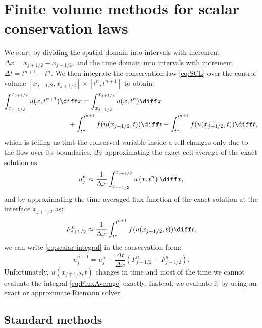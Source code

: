 \section{Finite volume methods for scalar conservation laws}
\label{sec:FVM-scalar}

We start by dividing the spatial domain into intervals with increment $ \Delta x = x_{j+1/2} - x_{j-1/2} $, and the time domain into intervals with increment $ \Delta t = t^{n+1} - t^n $. We then integrate the conservation law \eqref{eq:SCL} over the control volume $ \left[ x_{j-1/2}, x_{j+1/2} \right] \times \left[ t^n, t^{n+1} \right] $ to obtain:
\begin{align} \label{eq:scalar-integral}
\int_{x_{j-1/2}}^{x_{j+1/2}} u(x,t^{n+1}) \diff x & = \int_{x_{j-1/2}}^{x_{j+1/2}} u(x,t^n) \diff x \notag \\
 & \hspace{-7mm} + \int_{t^n}^{t^{n+1}} f(u(x_{j-1/2},t)) \diff t - \int_{t^n}^{t^{n+1}} f(u(x_{j+1/2},t)) \diff t,
\end{align}
which is telling us that the conserved variable inside a cell changes only due to the flow over its boundaries. By approximating the exact cell average of the exact solution as:
\begin{equation} \label{eq:CellAverage}
u_j^n \approx \frac{1}{\Delta x} \int_{x_{j-1/2}}^{x_{j+1/2}} u \left( x,t^n \right) \diff x,
\end{equation} 
and by approximating the time averaged flux function of the exact solution at the interface $ x_{j+1/2} $ as:
\begin{equation} \label{eq:FluxAverage}
F_{j+1/2}^n \approx \frac{1}{\Delta x} \int_{t^n}^{t^{n+1}} f(u(x_{j+1/2},t)) \diff t,
\end{equation}
we can write \eqref{eq:scalar-integral} in the conservation form:
\begin{equation} \label{eq:scalar-CF0}
u_j^{n+1} = u_j^n - \frac{\Delta t}{\Delta x} \left( F_{j+1/2}^n - F_{j-1/2}^n \right).
\end{equation}
Unfortunately, $ u\left( x_{j\mp 1/2}, t \right) $ changes in time and most of the time we cannot evaluate the integral \eqref{eq:FluxAverage} exactly. Instead, we evaluate it by using an exact or approximate Riemann solver.

\subsection{Standard methods}
\label{s:standard-methods}

